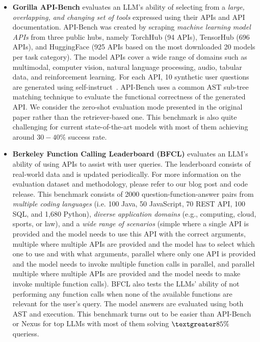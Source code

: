 \begin{itemize}
    \item \textbf{Gorilla API-Bench} evaluates an LLM's ability of selecting from a \textit{large, overlapping, and changing set of tools} expressed using their APIs and API documentation. API-Bench was created by scraping \textit{machine learning model APIs} from three public hubs, namely TorchHub (94 APIs), TensorHub (696 APIs), and HuggingFace (925 APIs based on the most downloaded 20 models per task category). The model APIs cover a wide range of domains such as multimodal, computer vision, natural language processing, audio, tabular data, and reinforcement learning. For each API, 10 synthetic user questions are generated using self-instruct~\cite{wang2023selfinstructaligninglanguagemodels}. API-Bench uses a common AST sub-tree matching technique to evaluate the functional correctness of the generated API. We consider the zero-shot evaluation mode presented in the original paper rather than the retriever-based one. This benchmark is also quite challenging for current state-of-the-art models with most of them achieving around $30-40\%$ success rate.

    \item \textbf{Berkeley Function Calling Leaderboard (BFCL)} evaluates an LLM's ability of using APIs to assist with user queries. The leaderboard consists of real-world data and is updated periodically. For more information on the evaluation dataset and methodology, please refer to our blog post and code release. This benchmark consists of 2000 question-function-answer pairs from \textit{multiple coding languages} (i.e. 100 Java, 50 JavaScript, 70 REST API, 100 SQL, and 1,680 Python), \textit{diverse application domains} (e.g., computing, cloud, sports, or law), and a \textit{wide range of scenarios} (simple where a single API is provided and the model needs to use this API with the correct arguments, multiple where multiple APIs are provided and the model has to select which one to use and with what arguments, parallel where only one API is provided and the model needs to invoke multiple function calls in parallel, and parallel multiple where multiple APIs are provided and the model needs to make invoke multiple function calls). BFCL also tests the LLMs' ability of not performing any function calls when none of the available functions are relevant for the user's query. The model answers are evaluated using both AST and execution. This benchmark turns out to be easier than API-Bench or Nexus for top LLMs with most of them solving $\textgreater 85\%$ queriess.
\end{itemize}


